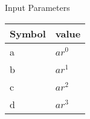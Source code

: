 \setlength{\arrayrulewidth}{0.3mm}
\setlength{\tabcolsep}{12pt}
\renewcommand{\arraystretch}{1.3}


\begin{center}
\caption{Input Parameters}
\begin{tabular}{ |p{2.0cm}|p{2.0cm}| }

\hline
 {Symbol}&{value}\\
\hline
a & $ar^0$ \\
\hline
b & $ar^1$ \\
\hline
c & $ar^2$ \\
\hline
d & $ar^3$ \\
\hline

\end{tabular}
\end{center}
